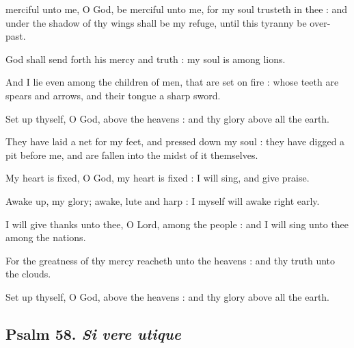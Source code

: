  merciful unto me, O God, be merciful unto me, for my soul trusteth in thee : and under the shadow of thy wings shall be my refuge, until this tyranny be over-past.\par
{}
God shall send forth his mercy and truth : my soul is among lions.\par
{}And I lie even among the children of men, that are set on fire : whose teeth are spears and arrows, and their tongue a sharp sword.\par
{}Set up thyself, O God, above the heavens : and thy glory above all the earth.\par
{}They have laid a net for my feet, and pressed down my soul : they have digged a pit before me, and are fallen into the midst of it themselves.\par
{}My heart is fixed, O God, my heart is fixed : I will sing, and give praise.\par
{}Awake up, my glory; awake, lute and harp : I myself will awake right early.\par
{}I will give thanks unto thee, O Lord, among the people : and I will sing unto thee among the nations.\par
{}For the greatness of thy mercy reacheth unto the heavens : and thy truth unto the clouds.\par
{}Set up thyself, O God, above the heavens : and thy glory above all the earth.\par

\subsection{Psalm 58. \textit{Si vere utique}}


